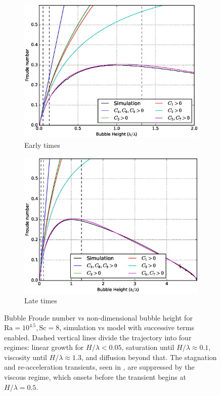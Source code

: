 \begin{figure}
\begin{subfigure}[b]{\columnwidth}
\includegraphics[width=\columnwidth]{figs/Cascade-short-32-4}
\caption{Early times}
\end{subfigure}
\begin{subfigure}[b]{\columnwidth}
\includegraphics[width=\columnwidth]{figs/Cascade-32-4}
\caption{Late times}
\end{subfigure}
\caption{ 
Bubble Froude number vs non-dimensional bubble height for $\text{Ra} = 10^{4.5}, \text{Sc} = 8$, simulation vs model with successive terms enabled.
Dashed vertical lines divide the trajectory into four regimes: linear growth for $H/\lambda < 0.05$, saturation until $H / \lambda \approx 0.1$, viscosity until $H / \lambda \approx 1.3$, and diffusion beyond that.
The stagnation and re-acceleration transients, seen in , are suppressed by the viscous regime, which onsets before the transient begins at $H / \lambda = 0.5$.
}
\end{figure}


